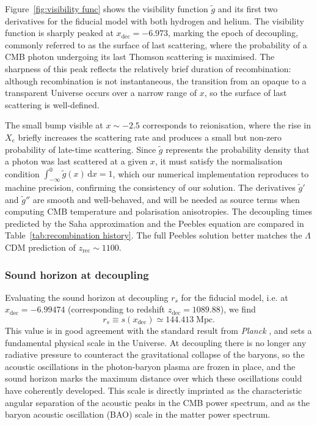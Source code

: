 \documentclass[twocolumn]{aa}
\begin{document}
Figure~\ref{fig:visibility func} shows the visibility function $\tilde{g}$ and its first two derivatives for the fiducial model with both hydrogen and helium. The visibility function is sharply peaked at $x_\mathrm{dec} = -6.973$, marking the epoch of decoupling, commonly referred to as the surface of last scattering, where the probability of a CMB photon undergoing its last Thomson scattering is maximised. The sharpness of this peak reflects the relatively brief duration of recombination: although recombination is not instantaneous, the transition from an opaque to a transparent Universe occurs over a narrow range of $x$, so the surface of last scattering is well-defined.

The small bump visible at $x \sim -2.5$ corresponds to reionisation, where the rise in $X_e$ briefly increases the scattering rate and produces a small but non-zero probability of late-time scattering. Since $\tilde{g}$ represents the probability density that a photon was last scattered at a given $x$, it must satisfy the normalisation condition $\int_{-\infty}^{0} \tilde{g}(x)\,\mathrm{d}x = 1$, which our numerical implementation reproduces to machine precision, confirming the consistency of our solution. The derivatives $\tilde{g}'$ and $\tilde{g}''$ are smooth and well-behaved, and will be needed as source terms when computing CMB temperature and polarisation anisotropies. The decoupling times predicted by the Saha approximation and the Peebles equation are compared in Table~\ref{tab:recombination history}. The full Peebles solution better matches the $\Lambda$CDM prediction of $z_\text{rec}\sim 1100$.



\subsubsection{Sound horizon at decoupling}

Evaluating the sound horizon at decoupling $r_s$ for the fiducial model, i.e. at $x_\mathrm{dec} = -6.99474$ (corresponding to redshift $z_\mathrm{dec} = 1089.88$), we find
\begin{equation}
    r_s \equiv s(x_\mathrm{dec}) \simeq 144.413\;\mathrm{Mpc}.\label{eq:rs}
\end{equation}
This value is in good agreement with the standard result from \textit{Planck} \citep{planck2020}, and sets a fundamental physical scale in the Universe. At decoupling there is no longer any radiative pressure to counteract the gravitational collapse of the baryons, so the acoustic oscillations in the photon-baryon plasma are frozen in place, and the sound horizon marks the maximum distance over which these oscillations could have coherently developed. This scale is directly imprinted as the characteristic angular separation of the acoustic peaks in the CMB power spectrum, and as the baryon acoustic oscillation (BAO) scale in the matter power spectrum.
\end{document}

